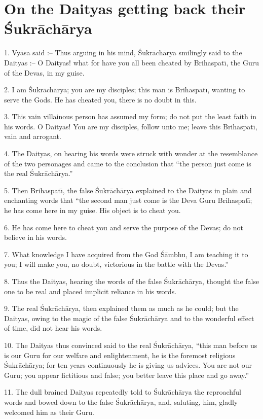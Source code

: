 \chapter{On the Daityas getting back their \'Sukr\=ach\=arya}

1. Vy\=asa said :-- Thus arguing in his mind, \'Sukr\=ach\=arya smilingly said to the Daityas :-- O Daityas! what for have you all been cheated by Brihaspat\={\i}, the Guru of the Devas, in my guise.

2. I am \'Sukr\=ach\=arya; you are my disciples; this man is Brihaspat\={\i}, wanting to serve the Gods. He has cheated you, there is no doubt in this.

3. This vain villainous person has assumed my form; do not put the least faith in his words. O Daityas! You are my disciples, follow unto me; leave this Brihaspat\={\i}, vain and arrogant.

4. The Daityas, on hearing his words were struck with wonder at the resemblance of the two personages and came to the conclusion that ``the person just come is the real \'Sukr\=ach\=arya.''

5. Then Brihaspat\={\i}, the false \'Sukr\=ach\=arya explained to the Daityas in plain and enchanting words that ``the second man just come is the Deva Guru Brihaspat\={\i}; he has come here in my guise. His object is to cheat you.

6. He has come here to cheat you and serve the purpose of the Devas; do not believe in his words.

7. What knowledge I have acquired from the God \'S\=ambhu, I am teaching it to you; I will make you, no doubt, victorious in the battle with the Devas.''

8. Thus the Daityas, hearing the words of the false \'Sukr\=ach\=arya, thought the false one to be real and placed implicit reliance in his words.

9. The real \'Sukr\=ach\=arya, then explained them as much as he could; but the Daityas, owing to the magic of the false \'Sukr\=ach\=arya and to the wonderful effect of time, did not hear his words.

10. The Daityas thus convinced said to the real \'Sukr\=ach\=arya, ``this man before us is our Guru for our welfare and enlightenment, he is the foremost religious \'Sukr\=ach\=arya; for ten years continuously he is giving us advices. You are not our Guru; you appear fictitious and false; you better leave this place and go away.''

11. The dull brained Daityas repeatedly told to \'Sukr\=ach\=arya the reproachful words and bowed down to the false \'Sukr\=ach\=arya, and, saluting, him, gladly welcomed him as their Guru.


